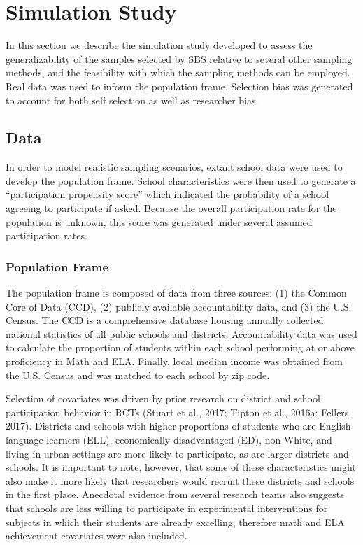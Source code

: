 \documentclass[man,floatsintext]{apa6}
\theoremstyle{definition}
\theoremstyle{definition}
\theoremstyle{definition}
\theoremstyle{remark}
\begin{document}
\hypertarget{simulation-study}{%
\section{Simulation Study}\label{simulation-study}}

In this section we describe the simulation study developed to assess the
generalizability of the samples selected by SBS relative to several
other sampling methods, and the feasibility with which the sampling
methods can be employed. Real data was used to inform the population
frame. Selection bias was generated to account for both self selection
as well as researcher bias.

\hypertarget{data}{%
\subsection{Data}\label{data}}

In order to model realistic sampling scenarios, extant school data were
used to develop the population frame. School characteristics were then
used to generate a \enquote{participation propensity score} which
indicated the probability of a school agreeing to participate if asked.
Because the overall participation rate for the population is unknown,
this score was generated under several assumed participation rates.

\hypertarget{population-frame}{%
\subsubsection{Population Frame}\label{population-frame}}

The population frame is composed of data from three sources: (1) the
Common Core of Data (CCD), (2) publicly available accountability data,
and (3) the U.S. Census. The CCD is a comprehensive database housing
annually collected national statistics of all public schools and
districts. Accountability data was used to calculate the proportion of
students within each school performing at or above proficiency in Math
and ELA. Finally, local median income was obtained from the U.S. Census
and was matched to each school by zip code.

Selection of covariates was driven by prior research on district and
school participation behavior in RCTs (Stuart et al., 2017; Tipton et
al., 2016a; Fellers, 2017). Districts and schools with higher
proportions of students who are English language learners (ELL),
economically disadvantaged (ED), non-White, and living in urban settings
are more likely to participate, as are larger districts and schools. It
is important to note, however, that some of these characteristics might
also make it more likely that researchers would recruit these districts
and schools in the first place. Anecdotal evidence from several research
teams also suggests that schools are less willing to participate in
experimental interventions for subjects in which their students are
already excelling, therefore math and ELA achievement covariates were
also included.
\end{document}
